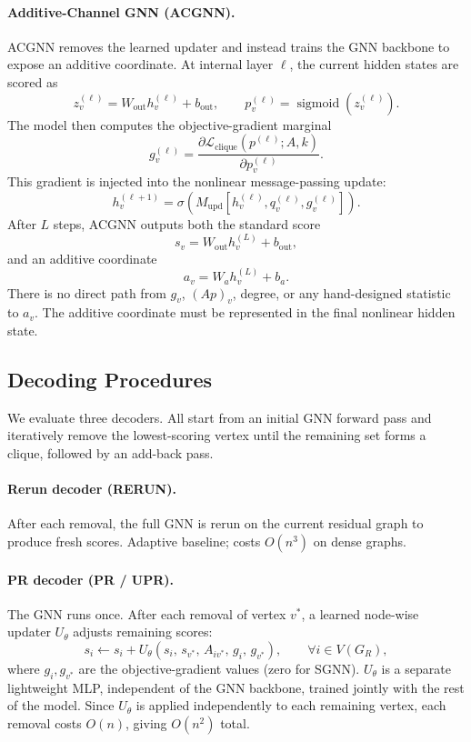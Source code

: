 \documentclass[11pt]{article}
\newcommand{\change}[1]{{\color{red}#1}}
\theoremstyle{plain}
\theoremstyle{definition}
\theoremstyle{remark}
\begin{document}
\paragraph{Additive-Channel GNN (ACGNN).}
ACGNN removes the learned updater and instead trains the GNN backbone to expose an
additive coordinate. At internal layer $\ell$, the current hidden states are scored as
\[
  z_v^{(\ell)}
  =
  W_{\mathrm{out}} h_v^{(\ell)} + b_{\mathrm{out}},
  \qquad
  p_v^{(\ell)}
  =
  \operatorname{sigmoid}(z_v^{(\ell)}).
\]
The model then computes the objective-gradient marginal
\[
  g_v^{(\ell)}
  =
  \frac{\partial
  \mathcal{L}_{\mathrm{clique}}(p^{(\ell)};A,k)}
  {\partial p_v^{(\ell)}} .
\]
This gradient is injected into the nonlinear message-passing update:
\[
  h_v^{(\ell+1)}
  =
  \sigma\!\left(
    M_{\mathrm{upd}}\!\left[
      h_v^{(\ell)},q_v^{(\ell)},g_v^{(\ell)}
    \right]
  \right).
\]
After $L$ steps, ACGNN outputs both the standard score
\[
  s_v = W_{\mathrm{out}}h_v^{(L)}+b_{\mathrm{out}},
\]
and an additive coordinate
\[
  a_v = W_a h_v^{(L)}+b_a .
\]
There is no direct path from $g_v$, $(Ap)_v$, degree, or any hand-designed statistic
to $a_v$. The additive coordinate must be represented in the final nonlinear hidden
state.

\subsection{Decoding Procedures}
\label{sec:decoding}

\change{We evaluate three decoders. All start from an initial GNN forward pass and
  iteratively remove the lowest-scoring vertex until the remaining set forms a clique,
followed by an add-back pass.}

\paragraph{Rerun decoder (RERUN).}
After each removal, the full GNN is rerun on the current residual graph to produce
fresh scores. Adaptive baseline; costs $O(n^3)$ on dense graphs.

\paragraph{PR decoder (PR / UPR).}
The GNN runs once. After each removal of vertex $v^*$, a learned node-wise updater
$U_\theta$ adjusts remaining scores:
\begin{equation}
  s_i \leftarrow s_i + U_\theta(s_i,\, s_{v^*},\, A_{i v^*},\, g_i,\, g_{v^*}),
  \qquad \forall i \in V(G_R),
  \label{eq:updater}
\end{equation}
\change{where $g_i, g_{v^*}$ are the objective-gradient values (zero for SGNN).
  $U_\theta$ is a separate lightweight MLP, independent of the GNN backbone, trained
jointly with the rest of the model.} Since $U_\theta$ is applied independently to
each remaining vertex, each removal costs $O(n)$, giving $O(n^2)$ total.
\end{document}
